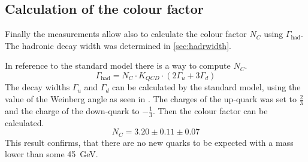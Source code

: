 \documentclass[epj,nopacs]{svjour}
\begin{document}
\subsection{Calculation of the colour factor}

Finally the measurements allow also to calculate the colour factor $N_C$ using
$Γ_{\mathrm{had}}$. The hadronic decay width was determined in \ref{sec:hadrwidth}.

In reference to the standard model there is a way to compute $N_C$.
\begin{equation}
 Γ_{\mathrm{had}} = N_C \cdot K_{QCD}\cdot ( 2Γ_u + 3Γ_d )
 \label{eqn:gammahad2}
\end{equation}
The decay widths $Γ_u$ and $Γ_d$ can be calculated by the standard model, using the
value of the Weinberg angle as seen in . The charges of the up-quark was
set to $\frac{2}{3}$ and the charge of the down-quark to $-\frac{1}{3}$. Then the colour
factor can be calculated.
\begin{equation}
 N_C = 3.20 \pm 0.11 \pm 0.07
\end{equation}
This result confirms, that there are no new quarks to be expected with a mass
lower than some \SI{45}{\GeV}.


\end{document}
